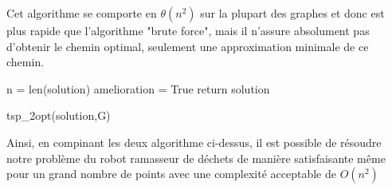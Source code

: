 \documentclass{report}
\begin{document}
  Cet algorithme se comporte en $\theta (n^2)$ sur la plupart des graphes et donc est plus rapide que l'algorithme "brute force", mais il n'assure absolument pas d'obtenir le chemin optimal, seulement une approximation minimale de ce chemin.\\
  \newline
  \begin{algorithm}[H]
    \SetAlgoLined
    n = len(solution)\;
    amelioration = True\;
    \;
    return solution\;
    \caption{tsp\_2opt(solution,G)}
  \end{algorithm}
  Ainsi, en compinant les deux algorithme ci-dessus, il est possible de résoudre notre problème du robot ramasseur de déchets de manière satisfaisante même pour un grand nombre de points avec une complexité acceptable de $O(n^2)$
\end{document}
